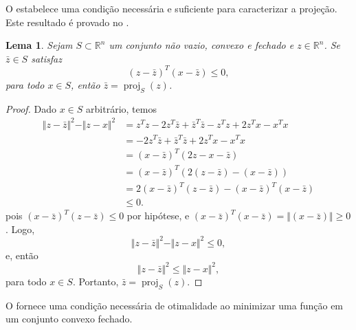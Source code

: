 \documentclass[12pt,a4paper]{scrartcl}
\DeclareMathOperator{\proj}{proj}
\def\RR{\mathds{R}}
\newtheorem{lema}{Lema}
\theoremstyle{definition}%
\begin{document}
O  estabelece uma condição necessária e suficiente para caracterizar a projeção. Este resultado é provado no .


\begin{lema} \label{lema:defineprojecao_convexidade}
Sejam $S \subset \RR^{n}$ um conjunto não vazio, convexo e fechado e $z \in \RR^{n}$. Se $\bar{z} \in S$ satisfaz
\[
(z - \bar{z})^{T}(x - \bar{z}) \leq 0 ,
\]
para todo $x \in S$, então $\bar{z} = \proj_{S} (z)$.
\end{lema}
\begin{proof}
Dado $x\in S$ arbitrário, temos
\begin{align}
\Vert z-\bar{z} \Vert^{2} - \Vert z-x \Vert^{2} & = z^{T}z - 2z^{T}\bar{z} + \bar{z}^{T}\bar{z} - z^{T}z + 2z^{T}x - x^{T}x \\
& = - 2z^{T}\bar{z} + \bar{z}^{T}\bar{z} + 2z^{T}x - x^{T}x \\
& = (x-\bar{z})^{T}(2z-x-\bar{z}) \\
& = (x-\bar{z})^{T}(2(z-\bar{z})-(x-\bar{z})) \\
& = 2(x-\bar{z})^{T}(z-\bar{z}) - (x-\bar{z})^{T}(x-\bar{z}) \\
& \leq 0 .
\end{align}
pois $(x-\bar{z})^{T}(z-\bar{z}) \leq 0$ por hipótese, e $(x-\bar{z})^{T}(x-\bar{z}) = \Vert (x-\bar{z}) \Vert \geq 0$.
Logo,
\[
\Vert z-\bar{z} \Vert^{2} - \Vert z-x \Vert^{2} \leq 0,
\]
e, então
\[
\Vert z-\bar{z} \Vert^{2} \leq \Vert z-x \Vert^{2} ,
\]
para todo $x\in S$. Portanto, $\bar{z} = \proj_{S} (z)$.
\end{proof}


O  fornece uma condição necessária de otimalidade ao minimizar uma função em um conjunto convexo fechado.
\end{document}
